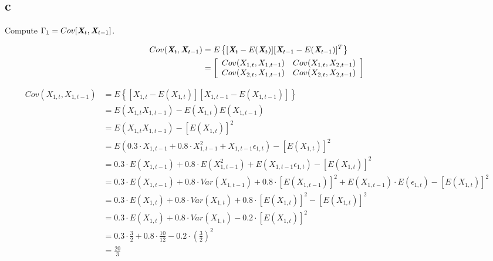 \subsection{c} 
\label{section_1_c}
Compute $\Gamma_1 = Cov[\textbf{\em X}_t,\textbf{\em X}_{t-1}]$.

\begin{solution}

\begin{equation}
\begin{aligned}
Cov(\textbf{\em X}_t,\textbf{\em X}_{t-1}) & = E\left\{[\textbf{\em X}_t-E(\textbf{\em X}_t)][\textbf{\em X}_{t-1}-E(\textbf{\em X}_{t-1})]^T\right\} \\
									                 & =\left[\begin{array}{cc} Cov(X_{1,t},X_{1,t-1}) & Cov(X_{1,t},X_{2,t-1}) \\ Cov(X_{2,t},X_{1,t-1}) & Cov(X_{2,t},X_{2,t-1}) \end{array}\right] \\
\end{aligned}
\end{equation}

\begin{equation}
\begin{aligned}
Cov(X_{1,t},X_{1,t-1}) 	& = E\left\{[X_{1,t} - E(X_{1,t})][X_{1,t-1} - E(X_{1,t-1})]\right\} \\
												& = E(X_{1,t}X_{1,t-1}) - E(X_{1,t})E(X_{1,t-1}) \\
												& = E(X_{1,t}X_{1,t-1}) - [E(X_{1,t})]^2 \\
												& = E\left(0.3 \cdot X_{1,t-1} + 0.8 \cdot X_{1,t-1}^2 +  X_{1,t-1}\epsilon_{1,t} \right) - [E(X_{1,t})]^2 \\
												& = 0.3 \cdot E(X_{1,t-1}) + 0.8 \cdot E(X_{1,t-1}^2) +  E(X_{1,t-1}\epsilon_{1,t}) - [E(X_{1,t})]^2 \\
												& = 0.3 \cdot E(X_{1,t-1}) + 0.8 \cdot Var(X_{1,t-1}) + 0.8 \cdot [E(X_{1,t-1})]^2 +  E(X_{1,t-1}) \cdot E(\epsilon_{1,t}) - [E(X_{1,t})]^2 \\
												& = 0.3 \cdot E(X_{1,t}) + 0.8 \cdot Var(X_{1,t}) + 0.8 \cdot [E(X_{1,t})]^2 - [E(X_{1,t})]^2 \\
												& = 0.3 \cdot E(X_{1,t}) + 0.8 \cdot Var(X_{1,t}) - 0.2 \cdot [E(X_{1,t})]^2 \\
												& = 0.3 \cdot \frac{3}{2} + 0.8 \cdot \frac{10}{12} - 0.2 \cdot \left(\frac{3}{2}\right)^2 \\
												& = \frac{20}{3}
\end{aligned}
\end{equation}


\end{solution}
